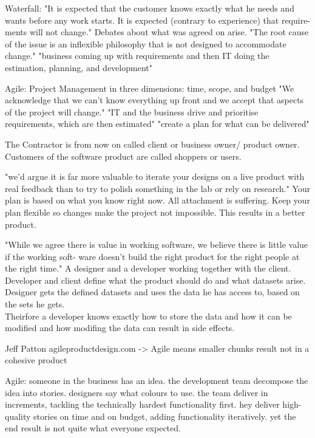 Waterfall:
"It is expected that the customer knows exactly what he needs and wants before any work starts. It is expected (contrary to experience) that require- ments will not change." Debates about what was agreed on arise. "The root cause of the issue is an inflexible philosophy that is not designed to accommodate change." \citep{ratcliffe2011agile:30}
"business coming up with requirements and then IT doing the estimation, planning, and development"

Agile:
Project Management in three dimensions: time, scope, and budget
"We acknowledge that we can’t know everything up front and we accept that aspects of the project will change." 
"IT and the business drive and prioritise requirements, which are then estimated" "create a plan for what can be delivered"
\citep{ratcliffe2011agile:30:31}

The Contractor is from now on called client or business owner/ product owner.
Customers of the software product are called shoppers or users.

"we'd argue it is far more valuable to iterate your designs on a live product with real feedback than to try to polish something in the lab or rely on research." \citep{ratcliffe2011agile:32}
Your plan is based on what you know right now. All attachment is suffering. Keep your plan flexible so changes make the project not impossible. This results in a better product.

"While we agree there is value in working software, we believe there is little value if the working soft- ware doesn’t build the right product for the right people at the right time." \citep{ratcliffe2011agile:33}
A designer and a developer working together with the client. Developer and client define what the product should do and what datasets arise. Designer gets the defined datasets and uses the data he has access to, based on the sets he gets.\\
Theirfore a developer knows exactly how to store the data and how it can be modified and how modifing the data can result in side effects.

Jeff Patton agileproductdesign.com -> Agile means smaller chunks result not in a cohesive product

Agile:
someone in the business has an idea.
the development team decompose the idea into stories.
designers say what colours to use.
the team deliver in increments, tackling the technically hardest functionality first.
hey deliver high- quality stories on time and on budget, adding functionality iteratively.
yet the end result is not quite what everyone expected.
\citep{ratcliffe2011agile:34:35}

